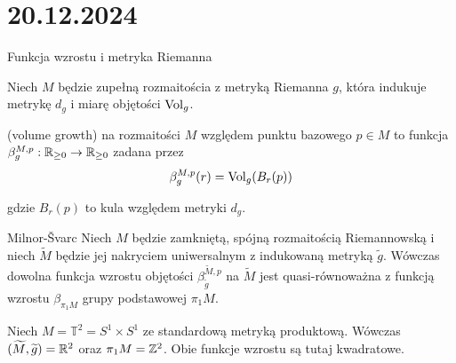 \section{20.12.2024}{Funkcja wzrostu i metryka Riemanna}


\begin{definition}{}{}
  Niech $M$ będzie zupełną rozmaitościa z metryką Riemanna $g$, która indukuje metrykę $d_g$ i miarę objętości $\operatorname{Vol}_g$.

   (volume growth) na rozmaitości $M$ względem punktu bazowego $p\in M$ to funkcja $\beta_g^{M,p}:\mathbb{R}_{\geq 0}\to \mathbb{R}_{\geq0}$ zadana przez 
  $$\beta_g^{M,p}(r)=\operatorname{Vol}_g(B_r(p))$$
  
  gdzie $B_r(p)$ to kula względem metryki $d_g$.
\end{definition}

\begin{lemma}{Milnor-\v{S}varc}{}
  Niech $M$ będzie zamkniętą, spójną rozmaitością Riemannowską i niech $\widetilde{M}$ będzie jej nakryciem uniwersalnym z indukowaną metryką $\widetilde{g}$. Wówczas dowolna funkcja wzrostu objętości $\beta_{\widetilde{g}}^{\widetilde{M},p}$ na $\widetilde{M}$ jest quasi-równoważna z funkcją wzrostu $\beta_{\pi_1 M}$ grupy podstawowej $\pi_1M$.
\end{lemma}

\begin{example}
  Niech $M=\mathbb{T}^2=S^1\times S^1$ ze standardową metryką produktową. Wówczas $(\widetilde{M}, \widetilde{g})=\mathbb{R}^2$ oraz $\pi_1M=\mathbb{Z}^2$. Obie funkcje wzrostu są tutaj kwadratowe.
\end{example}

